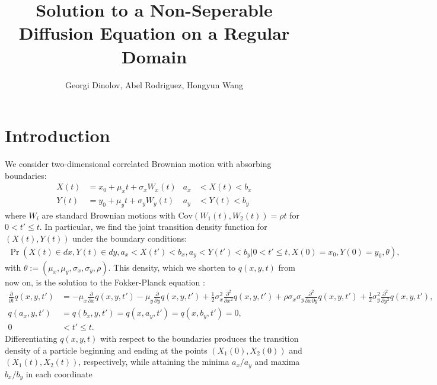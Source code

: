 \documentclass[10pt]{article}
\title{Solution to a Non-Seperable Diffusion Equation on a Regular Domain}
\author{Georgi Dinolov, Abel Rodriguez, Hongyun Wang}
\date{} %
\begin{document}
\def\spacingset#1{\renewcommand{\baselinestretch}%
{#1}\small\normalsize} \spacingset{1}

\bigskip

\vspace{1cm}
\noindent

\spacingset{1.00} %
\section{Introduction}

We consider two-dimensional correlated Brownian motion with absorbing boundaries:
\begin{align}
  X(t) &= x_0 + \mu_x t + \sigma_x W_x(t) &a_x &< X(t) < b_x   \label{eq:X} \\
  Y(t) &= y_0 + \mu_y t + \sigma_y W_y(t) &a_y &< Y(t) < b_y   \label{eq:Y} 
\end{align}
where $W_i$ are standard Brownian motions with
$\mbox{Cov}(W_1(t), W_2(t)) = \rho t$ for $0 < t' \leq t$. In
particular, we find the joint transition density function for
$(X(t), Y(t))$ under the boundary conditions:
\begin{align}
  \Pr\left(X(t) \in dx, Y(t) \in dy, a_x < X(t') < b_x, a_y < Y(t') < b_y |0 < t' \leq t, X(0)=x_0, Y(0)=y_0, \theta \right), \label{eq:CDF} 
\end{align}
with $\theta := (\mu_x, \mu_y, \sigma_x, \sigma_y, \rho).$ This
density, which we shorten to $q(x,y,t)$ from now on, is the solution
to the Fokker-Planck equation \citep{oksendal2013stochastic}:
\begin{align}
  \frac{\partial}{\partial t} q(x,y,t') &= -\mu_x \frac{\partial}{\partial x}q(x,y,t')
                                         - \mu_y \frac{\partial}{\partial y}q(x,y,t')
                                         + \frac{1}{2}\sigma_x^2 \frac{\partial^2}{\partial x^2}q(x,y,t')
                                         + \rho\sigma_x\sigma_y \frac{\partial^2}{\partial x \partial y}q(x,y,t')
                                         + \frac{1}{2}\sigma_y^2 \frac{\partial^2}{\partial y^2}q(x,y,t'),
  \label{eq:1} \\
  q(a_x, y,t') &= q(b_x,y,t') = q(x,a_y,t') = q(x,b_y,t') = 0, \label{eq:2} \\
   0 &< t' \leq t. \nonumber
\end{align}
Differentiating $q(x,y,t)$ with respect to the boundaries produces the
transition density of a particle beginning and ending at the points
$(X_1(0), X_2(0))$ and $(X_1(t), X_2(t))$, respectively, while
attaining the minima $a_x/a_y$ and maxima $b_x/b_y$ in each coordinate
\end{document}

